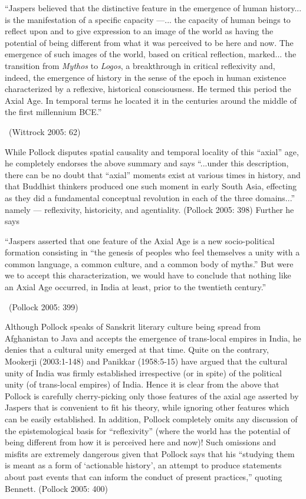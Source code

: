 \begin{myquote}
“Jaspers believed that the distinctive feature in the emergence of human history... is the manifestation of a specific capacity —... the capacity of human beings to reflect upon and to give expression to an image of the world as having the potential of being different from what it was perceived to be here and now. The emergence of such images of the world, based on critical reflection, marked... the transition from \textit{Mythos} to \textit{Logos}, a breakthrough in critical reflexivity and, indeed, the emergence of history in the sense of the epoch in human existence characterized by a reflexive, historical consciousness. He termed this period the Axial Age. In temporal terms he located it in the centuries around the middle of the first millennium BCE.” 

~\hfill (Wittrock 2005: 62)
\end{myquote}

While Pollock disputes spatial causality and temporal locality of this “axial” age, he completely endorses the above summary and says “...under this description, there can be no doubt that “axial” moments exist at various times in history, and that Buddhist thinkers produced one such moment in early South Asia, effecting as they did a fundamental conceptual revolution in each of the three domains...” namely — reflexivity, historicity, and agentiality. (Pollock 2005: 398) Further he says

\begin{myquote}
“Jaspers asserted that one feature of the Axial Age is a new socio-political formation consisting in “the genesis of peoples who feel themselves a unity with a common language, a common culture, and a common body of myths.” But were we to accept this characterization, we would have to conclude that nothing like an Axial Age occurred, in India at least, prior to the twentieth century.” 

~\hfill (Pollock 2005: 399)
\end{myquote}

Although Pollock speaks of Sanskrit literary culture being spread from Afghanistan to Java and accepts the emergence of trans-local empires in India, he denies that a cultural unity emerged at that time. Quite on the contrary, Mookerji (2003:1-148) and Panikkar (1958:5-15) have argued that the cultural unity of India was firmly established irrespective (or in spite) of the political unity (of trans-local empires) of India. Hence it is clear from the above that Pollock is carefully cherry-picking only those features of the axial age asserted by Jaspers that is convenient to fit his theory, while ignoring other features which can be easily established. In addition, Pollock completely omits any discussion of the epistemological basis for “reflexivity” (where the world has the potential of being different from how it is perceived here and now)! Such omissions and misfits are extremely dangerous given that Pollock says that his “studying them is meant as a form of ‘actionable history’, an attempt to produce statements about past events that can inform the conduct of present practices,” quoting Bennett. (Pollock 2005: 400)


